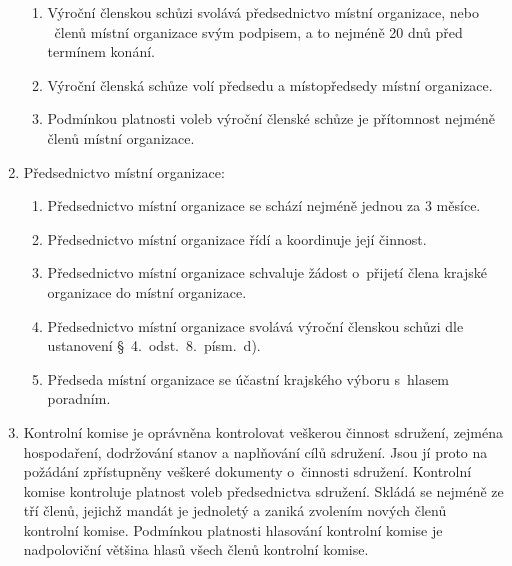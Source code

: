 \documentclass[a4paper]{article}
\begin{document}
\begin{enumerate}
\begin{enumerate}
        \item Výroční členskou schůzi svolává předsednictvo místní organizace,
            nebo ~členů místní organizace svým podpisem, a to
            nejméně 20 dnů před termínem konání.

        \item Výroční členská schůze volí předsedu a místopředsedy místní
            organizace.

        \item Podmínkou platnosti voleb výroční členské schůze
            je přítomnost nejméně  členů místní organizace.
        \end{enumerate}

    \item Předsednictvo místní organizace:
        \begin{enumerate}
        \item Předsednictvo místní organizace se schází nejméně jednou za
            3 měsíce.

        \item Předsednictvo místní organizace řídí a koordinuje její činnost.

        \item Předsednictvo místní organizace schvaluje žádost o~přijetí
            člena krajské organizace do místní organizace.

        \item Předsednictvo místní organizace svolává výroční členskou
            schůzi dle ustanovení \S~4.~odst.~8.~písm.~d).

        \item Předseda místní organizace se účastní krajského výboru
            s~hlasem poradním.
        \end{enumerate}

    \item Kontrolní komise je oprávněna kontrolovat veškerou činnost sdružení,
        zejména hospodaření, dodržování stanov a naplňování cílů sdružení.
        Jsou jí proto na požádání zpřístupněny veškeré dokumenty o~činnosti
        sdružení. Kontrolní komise kontroluje platnost voleb předsednictva
        sdružení. Skládá se nejméně ze tří členů, jejichž mandát je jednoletý
        a zaniká zvolením nových členů kontrolní komise. Podmínkou platnosti
        hlasování kontrolní komise je nadpoloviční většina hlasů všech členů
        kontrolní komise.
    \end{enumerate}
\end{document}
